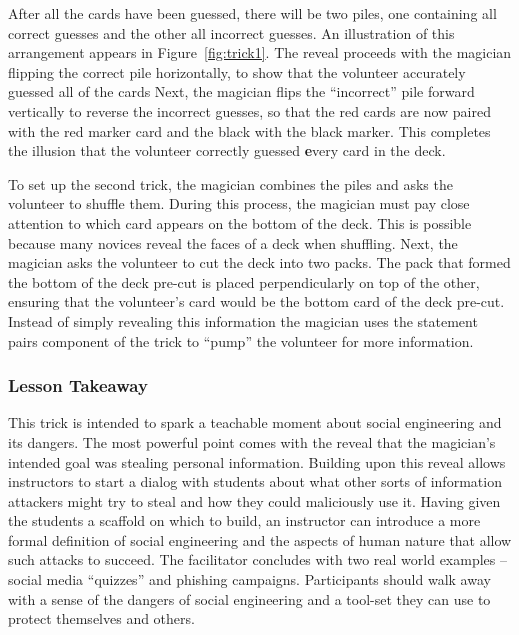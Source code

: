 After all the cards have been guessed, there will be two piles,
one containing all correct guesses and the other
all incorrect guesses.
An illustration of this arrangement appears in Figure~\ref{fig:trick1}.
The reveal proceeds with the magician flipping the correct pile horizontally, to show that the volunteer accurately guessed all of the cards
Next, the magician flips the ``incorrect'' pile forward vertically to 
reverse the incorrect guesses, so that the red cards are now paired
with the red marker card and the black with the black marker.  This completes
the illusion that the volunteer correctly guessed {\textbf every} card in the
deck.

To set up the second trick, the magician combines the piles and asks the
volunteer to shuffle them.  During this process, the magician must pay close
attention to which card appears on the bottom of the deck.  This is possible
because many novices reveal the faces of a deck when shuffling.  Next,
the magician asks the volunteer to cut the deck into two packs.  The pack that
formed the bottom of the deck pre-cut is placed perpendicularly on
top of the other, ensuring that the volunteer's card would be the bottom card of
the deck pre-cut. Instead of simply revealing this information the
magician uses the statement pairs component of the trick to ``pump'' the volunteer
for more information.

%

\subsubsection{Lesson Takeaway}

This trick is intended to spark a teachable moment about
social engineering and
its dangers.
The most powerful point comes with the reveal that the magician's
intended goal was stealing personal information.
Building upon this reveal allows instructors to start a dialog with
students about what other
sorts of information attackers might try to steal and
how they could maliciously use it.
Having given the students a scaffold on which to build,
an instructor can
introduce a more formal definition of social engineering
and the aspects of human nature that allow such attacks to succeed.
The facilitator concludes with two real world examples --
social media ``quizzes'' and phishing campaigns.
Participants should walk away with a sense of the
dangers of social engineering and a tool-set they can use to protect
themselves and others.


